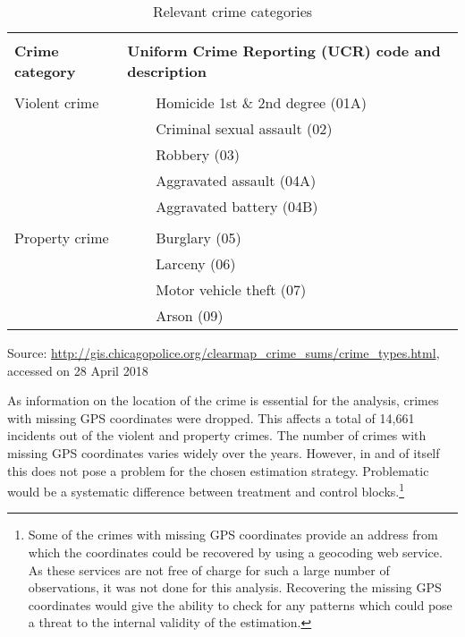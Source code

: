 \documentclass[]{article}
\newcommand{\tabitem}{~~\llap{\textbullet}~~}
\begin{document}
\begin{table}[H] \centering
	\caption{Relevant crime categories}
	\label{tab:crime_categories}
	\begin{threeparttable}
		\begin{tabular}{ll}
			\hline \\
			\textbf{Crime category} & \textbf{Uniform Crime Reporting (UCR) code and description} \\
			\hline \\
			Violent crime &  \tabitem Homicide 1st \& 2nd degree (01A)\\
			& \tabitem Criminal sexual assault (02) \\
			& \tabitem Robbery (03) \\
			& \tabitem Aggravated assault (04A) \\
			& \tabitem Aggravated battery (04B) \\
			\hline \\
			Property crime & \tabitem Burglary (05) \\
			& \tabitem Larceny (06) \\
			& \tabitem Motor vehicle theft (07) \\
			& \tabitem Arson (09) \\
			\hline
		\end{tabular}
		\begin{tablenotes}
			Source: \url{http://gis.chicagopolice.org/clearmap_crime_sums/crime_types.html}, accessed on 28 April 2018
		\end{tablenotes}
	\end{threeparttable}
\end{table}

As information on the location of the crime is essential for the analysis, crimes with missing GPS coordinates were dropped. This affects a total of 14,661 incidents out of the violent and property crimes. The number of crimes with missing GPS coordinates varies widely over the years. However, in and of itself this does not pose a problem for the chosen estimation strategy. Problematic would be a systematic difference between treatment and control blocks.\footnote{Some of the crimes with missing GPS coordinates provide an address from which the coordinates could be recovered by using a geocoding web service. As these services are not free of charge for such a large number of observations, it was not done for this analysis. Recovering the missing GPS coordinates would give the ability to check for any patterns which could pose a threat to the internal validity of the estimation.} \\
\end{document}
